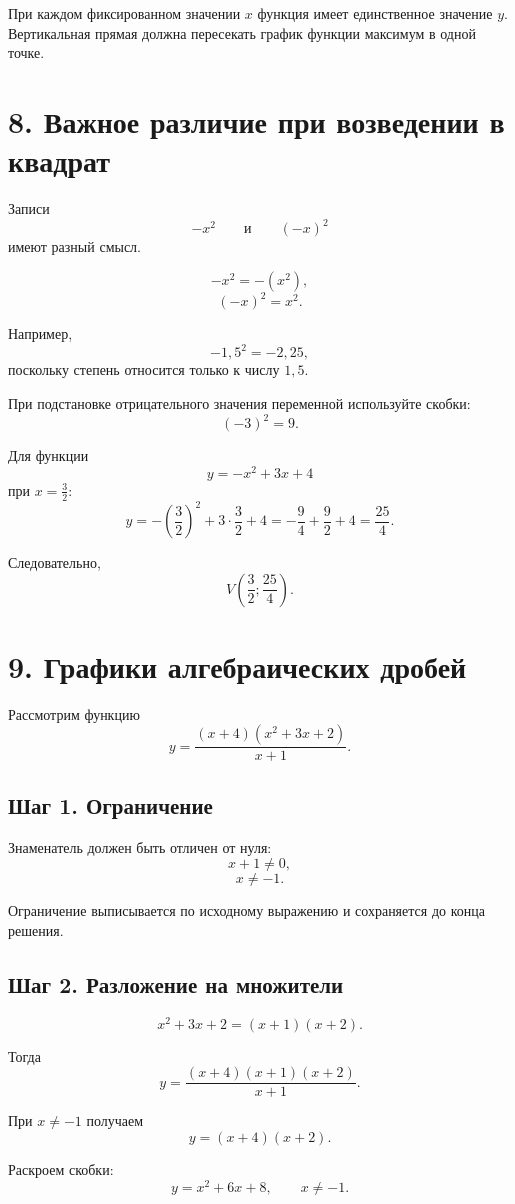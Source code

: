 \documentclass[a4paper,12pt]{article}
\begin{document}
При каждом фиксированном значении \(x\) функция имеет единственное значение \(y\). Вертикальная прямая должна пересекать график функции максимум в одной точке.

\section*{8. Важное различие при возведении в квадрат}

Записи
\[
  -x^2
  \qquad\text{и}\qquad
  (-x)^2
\]
имеют разный смысл.

\[
  -x^2=-(x^2),
\]
\[
  (-x)^2=x^2.
\]

Например,
\[
  -1{,}5^2=-2{,}25,
\]
поскольку степень относится только к числу \(1{,}5\).

При подстановке отрицательного значения переменной используйте скобки:
\[
  (-3)^2=9.
\]

Для функции
\[
  y=-x^2+3x+4
\]
при \(x=\frac32\):
\[
  y=
  -\left(\frac32\right)^2
  +3\cdot\frac32+4
  =
  -\frac94+\frac92+4
  =
  \frac{25}{4}.
\]

Следовательно,
\[
  V\left(\frac32;\frac{25}{4}\right).
\]

\section*{9. Графики алгебраических дробей}

Рассмотрим функцию
\[
  y=
  \frac{(x+4)(x^2+3x+2)}{x+1}.
\]

\subsection*{Шаг 1. Ограничение}

Знаменатель должен быть отличен от нуля:
\[
  x+1\ne 0,
\]
\[
  \boxed{x\ne -1}.
\]

Ограничение выписывается по исходному выражению и сохраняется до конца решения.

\subsection*{Шаг 2. Разложение на множители}

\[
  x^2+3x+2=(x+1)(x+2).
\]

Тогда
\[
  y=
  \frac{(x+4)(x+1)(x+2)}{x+1}.
\]

При \(x\ne -1\) получаем
\[
  y=(x+4)(x+2).
\]

Раскроем скобки:
\[
  y=x^2+6x+8,
  \qquad
  x\ne -1.
\]
\end{document}

